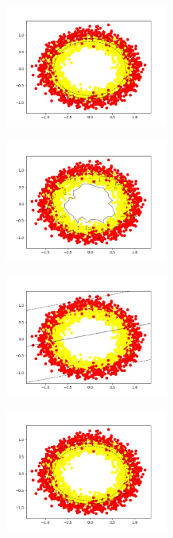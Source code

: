 \documentclass[12pt,titlepage,a4page , tikz , multi,table , svgnames,xcdraw]{article}
\begin{document}
\begin{center}

 \includegraphics[width=0.4\textwidth]{images/10.jpg}

\end{center}


\begin{center}

 \includegraphics[width=0.4\textwidth]{images/11.jpg}

\end{center}


\begin{center}

 \includegraphics[width=0.4\textwidth]{images/12.jpg}

\end{center}

\begin{center}

 \includegraphics[width=0.4\textwidth]{images/13.jpg}

\end{center}
\end{document}
